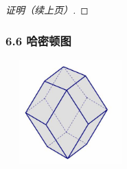\documentclass{beamer}
\theoremstyle{definition}
\theoremstyle{example}
\newtheorem*{Ex}{例：}
\begin{document}
\begin{CJK*}{UTF8}{gbsn}
\begin{frame}
{\begin{proof}[证明（续上页）]
  \end{proof}
}

\end{frame}



\begin{frame}[t]
  \frametitle{6.6 哈密顿图}
  \centering
  \includegraphics[width=5cm,height=4cm]{timg}
\end{frame}

   
   


\end{CJK*}
\end{document}
